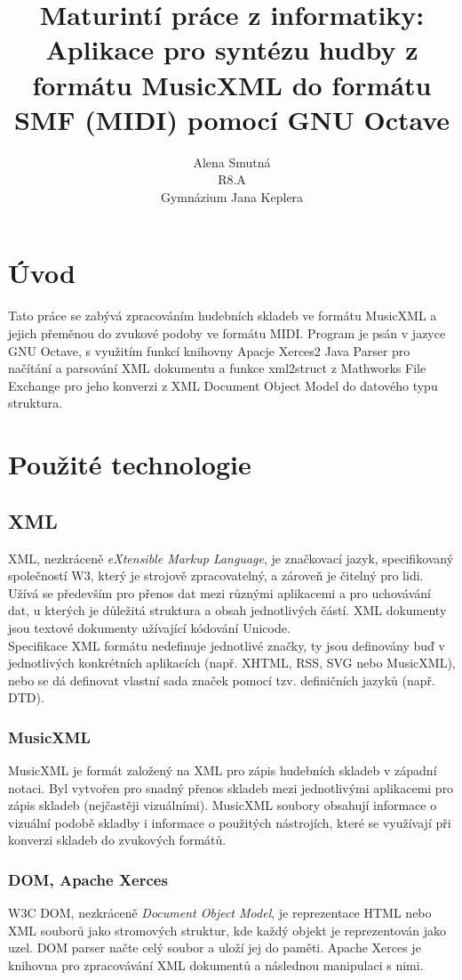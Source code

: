 \documentclass[12pt,a4paper,titlepage]{article}
\title{Maturintí práce z informatiky:\\
	Aplikace pro syntézu hudby z formátu MusicXML do formátu SMF (MIDI) pomocí GNU Octave}
\author{Alena Smutná\\
	R8.A\\
	Gymnázium Jana Keplera\\}
\begin{document}
	\renewcommand{\refname}{Literatura}
\maketitle
\tableofcontents
\newpage
\section{Úvod}
Tato práce se zabývá zpracováním hudebních skladeb ve formátu MusicXML a jejich přeměnou do zvukové podoby ve formátu MIDI. Program je psán v jazyce GNU Octave, s využitím funkcí knihovny Apacje Xerces2 Java Parser pro načítání a parsování XML dokumentu a funkce xml2struct z Mathworks File Exchange pro jeho konverzi z XML Document Object Model do datového typu struktura.
\section{Použité technologie}
\subsection{XML}
XML, nezkráceně \emph{eXtensible Markup Language}, je značkovací jazyk, specifikovaný společností W3, který je strojově zpracovatelný, a zároveň je čitelný pro lidi. Užívá se především pro přenos dat mezi různými aplikacemi a pro uchovávání dat, u kterých je důležitá struktura a obsah jednotlivých částí. XML dokumenty jsou textové dokumenty užívající kódování Unicode.
\\
Specifikace XML formátu nedefinuje jednotlivé značky, ty jsou definovány buď v jednotlivých konkrétních aplikacích (např. XHTML, RSS, SVG nebo MusicXML), nebo se dá definovat vlastní sada značek pomocí tzv. definičních jazyků (např. DTD). 
\subsubsection{MusicXML}
MusicXML je formát založený na XML pro zápis hudebních skladeb v západní notaci. Byl vytvořen pro snadný přenos skladeb mezi jednotlivými aplikacemi pro zápis skladeb (nejčastěji vizuálními). MusicXML soubory obsahují informace o vizuální podobě skladby i informace o použitých nástrojích, které se využívají při konverzi skladeb do zvukových formátů.
\subsubsection{DOM, Apache Xerces}
W3C DOM, nezkráceně \emph{Document Object Model}, je reprezentace HTML nebo XML souborů jako stromových struktur, kde každý objekt je reprezentován jako uzel. DOM parser načte celý soubor a uloží jej do paměti. Apache Xerces je knihovna pro zpracovávání XML dokumentů a následnou manipulaci s nimi.
\end{document}
